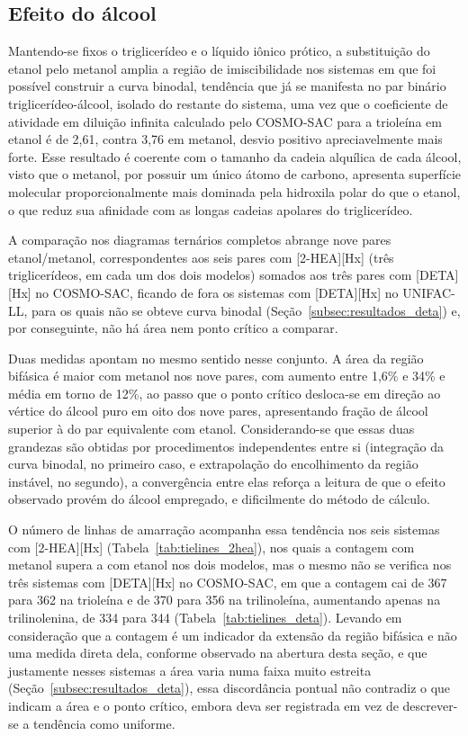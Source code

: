\subsection{Efeito do álcool}
\label{subsec:efeito_alcool}

Mantendo-se fixos o triglicerídeo e o líquido iônico prótico, a substituição do etanol pelo metanol amplia a região de imiscibilidade nos sistemas em que foi possível construir a curva binodal, tendência que já se manifesta no par binário triglicerídeo-álcool, isolado do restante do sistema, uma vez que o coeficiente de atividade em diluição infinita calculado pelo COSMO-SAC para a trioleína em etanol é de 2,61, contra 3,76 em metanol, desvio positivo apreciavelmente mais forte. Esse resultado é coerente com o tamanho da cadeia alquílica de cada álcool, visto que o metanol, por possuir um único átomo de carbono, apresenta superfície molecular proporcionalmente mais dominada pela hidroxila polar do que o etanol, o que reduz sua afinidade com as longas cadeias apolares do triglicerídeo.

A comparação nos diagramas ternários completos abrange nove pares etanol/metanol, correspondentes aos seis pares com [2-HEA][Hx] (três triglicerídeos, em cada um dos dois modelos) somados aos três pares com [DETA][Hx] no COSMO-SAC, ficando de fora os sistemas com [DETA][Hx] no UNIFAC-LL, para os quais não se obteve curva binodal (Seção~\ref{subsec:resultados_deta}) e, por conseguinte, não há área nem ponto crítico a comparar.

Duas medidas apontam no mesmo sentido nesse conjunto. A área da região bifásica é maior com metanol nos nove pares, com aumento entre 1,6\% e 34\% e média em torno de 12\%, ao passo que o ponto crítico desloca-se em direção ao vértice do álcool puro em oito dos nove pares, apresentando fração de álcool superior à do par equivalente com etanol. Considerando-se que essas duas grandezas são obtidas por procedimentos independentes entre si (integração da curva binodal, no primeiro caso, e extrapolação do encolhimento da região instável, no segundo), a convergência entre elas reforça a leitura de que o efeito observado provém do álcool empregado, e dificilmente do método de cálculo.

O número de linhas de amarração acompanha essa tendência nos seis sistemas com [2-HEA][Hx] (Tabela~\ref{tab:tielines_2hea}), nos quais a contagem com metanol supera a com etanol nos dois modelos, mas o mesmo não se verifica nos três sistemas com [DETA][Hx] no COSMO-SAC, em que a contagem cai de 367 para 362 na trioleína e de 370 para 356 na trilinoleína, aumentando apenas na trilinolenina, de 334 para 344 (Tabela~\ref{tab:tielines_deta}). Levando em consideração que a contagem é um indicador da extensão da região bifásica e não uma medida direta dela, conforme observado na abertura desta seção, e que justamente nesses sistemas a área varia numa faixa muito estreita (Seção~\ref{subsec:resultados_deta}), essa discordância pontual não contradiz o que indicam a área e o ponto crítico, embora deva ser registrada em vez de descrever-se a tendência como uniforme.

